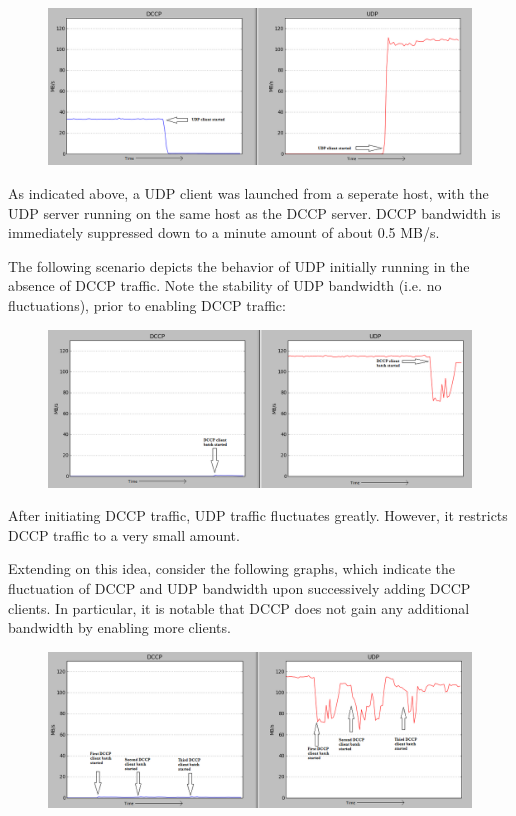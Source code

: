 \documentclass[10pt,a4paper]{article}
\begin{document}
\begin{figure}[!h]
\begin{center}
\includegraphics[scale=.4]{screens/re/Screenshot-44.png}
\end{center}
\end{figure}

As indicated above, a UDP client was launched from a seperate host, with the
UDP server running on the same host as the DCCP server. DCCP bandwidth
is immediately suppressed down to a minute amount of about
0.5 MB/s. 

The following scenario depicts the behavior of UDP initially running in the absence of DCCP traffic.
Note the stability of UDP bandwidth (i.e. no fluctuations), 
prior to enabling DCCP traffic:

\begin{figure}[!h]
\begin{center}
\includegraphics[scale=.4]{screens/re/Screenshot-46.png}
\end{center}
\end{figure}

After initiating DCCP traffic, UDP traffic fluctuates greatly. However, it restricts DCCP
traffic to a very small amount.

Extending on this idea, consider the following graphs, which indicate the fluctuation
of DCCP and UDP bandwidth upon successively adding DCCP clients. In particular, it is notable
that DCCP does not gain any additional bandwidth by enabling more clients.
\begin{figure}[!h]
\begin{center}
\includegraphics[scale=.4]{screens/re/Screenshot-48.png}
\end{center}
\end{figure}
\end{document}
